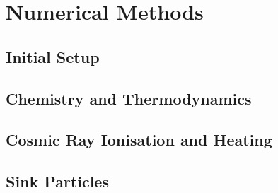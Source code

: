 \section{Numerical Methods}
\label{methods}

\subsection{Initial Setup}
\label{setup}

\subsection{Chemistry and Thermodynamics}
\label{chemistry}

\subsection{Cosmic Ray Ionisation and Heating}
\label{CRchem}

\subsection{Sink Particles}
\label{sinkParticles}